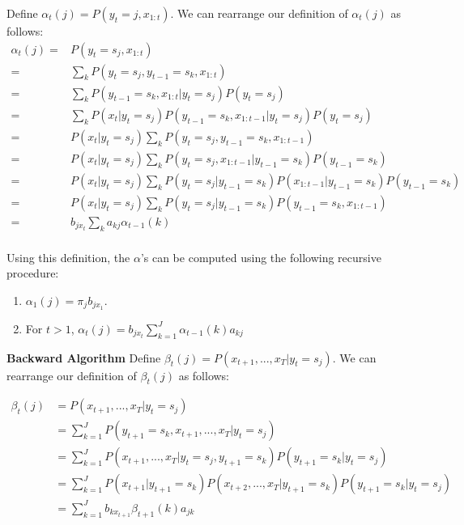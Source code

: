 \documentclass{article}
\begin{document}
Define $\alpha_t(j) = P(y_t = j, x_{1:t})$. We can rearrange our definition of $\alpha_t(j)$ as follows:
\begin{align*}
    \alpha_t(j)
    =&P(y_t=s_j, x_{1:t}) \\
    =& \sum_{k} P(y_t=s_j, y_{t-1}=s_k, x_{1:t}) \\
    =& \sum_{k} P(y_{t-1}=s_k, x_{1:t} \vert y_t = s_j) P(y_t = s_j) \\
    =& \sum_{k} P(x_t \vert y_t = s_j) P(y_{t-1}=s_k, x_{1:t-1} \vert y_t = s_j) P(y_t = s_j) \\
    =& P(x_t \vert y_t = s_j) \sum_{k} P(y_t = s_j, y_{t-1}=s_k, x_{1:t-1}) \\
    =& P(x_t \vert y_t = s_j) \sum_{k} P(y_t = s_j, x_{1:t-1} \vert y_{t-1}=s_k) P(y_{t-1}=s_k) \\
    =& P(x_t \vert y_t = s_j) \sum_{k} P(y_t = s_j \vert y_{t-1}=s_k) P(x_{1:t-1} \vert y_{t-1}=s_k) P(y_{t-1}=s_k) \\
    =& P(x_t \vert y_t = s_j) \sum_{k} P(y_t = s_j \vert y_{t-1}=s_k) P(y_{t-1}=s_k, x_{1:t-1}) \\
    =& b_{jx_t} \sum_{k} a_{kj} \alpha_{t-1}(k) \\
\end{align*}



Using this definition, the $\alpha$'s can be computed using the following recursive procedure:
\begin{enumerate}
    \item $\alpha_1(j)=\pi_jb_{jx_1}$. 
    \item For $t > 1$, $\alpha_{t}(j)=b_{jx_{t}}\sum_{k=1}^{J}\alpha_{t-1}(k)a_{kj}$ 
\end{enumerate}


\textbf{Backward Algorithm}
Define $\beta_t(j) = P(x_{t+1},...,x_T|y_t=s_j)$. We can rearrange our definition of $\beta_t(j)$ as follows:

\begin{align*}
    \beta_t(j) &= P(x_{t+1},...,x_T|y_t=s_j)\\
    &= \sum_{k=1}^JP(y_{t+1}=s_k,x_{t+1},...,x_T|y_t=s_j)\\
    &= \sum_{k=1}^JP(x_{t+1},...,x_T|y_t=s_j,y_{t+1}=s_k)P(y_{t+1}=s_k|y_t=s_j)\\
    &= \sum_{k=1}^JP(x_{t+1}|y_{t+1}=s_k)P(x_{t+2},...,x_T|y_{t+1}=s_k)P(y_{t+1}=s_k|y_t=s_j)\\
    &= \sum_{k=1}^J b_{kx_{t+1}}\beta_{t+1}(k)a_{jk}
\end{align*}
\end{document}
